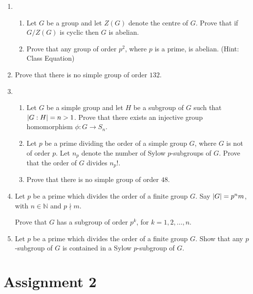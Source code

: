 \documentclass[notoc,notitlepage,nobib]{tufte-book}
\begin{document}
\begin{enumerate}
  \item \begin{enumerate}
      \item Let $G$ be a group and let $Z(G)$ denote the centre of $G$.  Prove
        that if $G / Z(G)$ is cyclic then $G$ is abelian.
      \item Prove that any group of order $p^2$, where $p$ is a prime, is
        abelian. (Hint: Class Equation)
    \end{enumerate}
  \item Prove that there is no simple group of order $132$.
  \item \begin{enumerate}
      \item Let $G$ be a simple group and let $H$ be a subgroup of $G$ such that
        $\left| G : H \right| = n > 1$. Prove that there exists an injective group
        homomorphism $\phi : G \to S_n$.
      \item Let $p$ be a prime dividing the order of a simple group $G$, where
        $G$ is not of order $p$. Let $n_p$ denote the number of Sylow
        $p$-subgroups of $G$. Prove that the order of $G$ divides $n_p !$.
      \item Prove that there is no simple group of order $48$.
    \end{enumerate}
  \item Let $p$ be a prime which divides the order of a finite group $G$. Say $\left|G\right| =  p^n m$, with $n \in \mathbb{N}$ and $p \nmid m$.

    Prove that $G$ has a subgroup of order $p^k$, for $k = 1, 2, \ldots, n$.
  \item Let $p$ be a prime which divides the order of a finite group $G$. Show that any $p$-subgroup of $G$ is contained in a Sylow $p$-subgroup of $G$.
\end{enumerate}


\section{Assignment 2}%
\label{sec:assignment_2}
\end{document}
